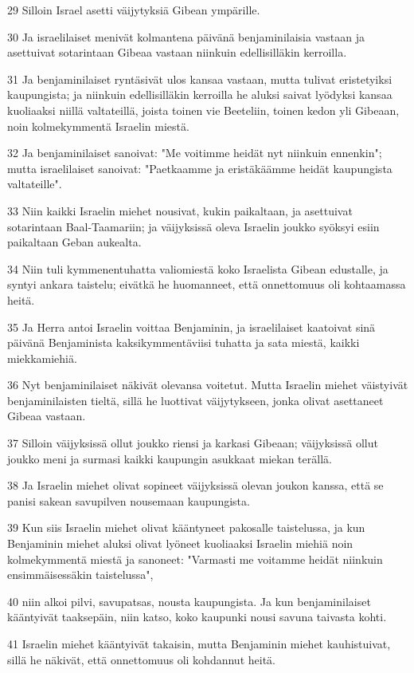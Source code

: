 \par 29 Silloin Israel asetti väijytyksiä Gibean ympärille.
\par 30 Ja israelilaiset menivät kolmantena päivänä benjaminilaisia vastaan ja asettuivat sotarintaan Gibeaa vastaan niinkuin edellisilläkin kerroilla.
\par 31 Ja benjaminilaiset ryntäsivät ulos kansaa vastaan, mutta tulivat eristetyiksi kaupungista; ja niinkuin edellisilläkin kerroilla he aluksi saivat lyödyksi kansaa kuoliaaksi niillä valtateillä, joista toinen vie Beeteliin, toinen kedon yli Gibeaan, noin kolmekymmentä Israelin miestä.
\par 32 Ja benjaminilaiset sanoivat: "Me voitimme heidät nyt niinkuin ennenkin"; mutta israelilaiset sanoivat: "Paetkaamme ja eristäkäämme heidät kaupungista valtateille".
\par 33 Niin kaikki Israelin miehet nousivat, kukin paikaltaan, ja asettuivat sotarintaan Baal-Taamariin; ja väijyksissä oleva Israelin joukko syöksyi esiin paikaltaan Geban aukealta.
\par 34 Niin tuli kymmenentuhatta valiomiestä koko Israelista Gibean edustalle, ja syntyi ankara taistelu; eivätkä he huomanneet, että onnettomuus oli kohtaamassa heitä.
\par 35 Ja Herra antoi Israelin voittaa Benjaminin, ja israelilaiset kaatoivat sinä päivänä Benjaminista kaksikymmentäviisi tuhatta ja sata miestä, kaikki miekkamiehiä.
\par 36 Nyt benjaminilaiset näkivät olevansa voitetut. Mutta Israelin miehet väistyivät benjaminilaisten tieltä, sillä he luottivat väijytykseen, jonka olivat asettaneet Gibeaa vastaan.
\par 37 Silloin väijyksissä ollut joukko riensi ja karkasi Gibeaan; väijyksissä ollut joukko meni ja surmasi kaikki kaupungin asukkaat miekan terällä.
\par 38 Ja Israelin miehet olivat sopineet väijyksissä olevan joukon kanssa, että se panisi sakean savupilven nousemaan kaupungista.
\par 39 Kun siis Israelin miehet olivat kääntyneet pakosalle taistelussa, ja kun Benjaminin miehet aluksi olivat lyöneet kuoliaaksi Israelin miehiä noin kolmekymmentä miestä ja sanoneet: "Varmasti me voitamme heidät niinkuin ensimmäisessäkin taistelussa",
\par 40 niin alkoi pilvi, savupatsas, nousta kaupungista. Ja kun benjaminilaiset kääntyivät taaksepäin, niin katso, koko kaupunki nousi savuna taivasta kohti.
\par 41 Israelin miehet kääntyivät takaisin, mutta Benjaminin miehet kauhistuivat, sillä he näkivät, että onnettomuus oli kohdannut heitä.
